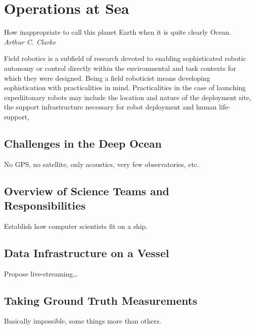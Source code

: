\chapter{Operations at Sea}

\begin{center}
    \begin{minipage}{0.5\textwidth}
      \begin{small}
        How inappropriate to call this planet Earth when it is quite clearly Ocean.\\ \emph{Arthur C. Clarke}
      \end{small}
    \end{minipage}
    \vspace{0.5cm}
\end{center}

Field robotics is a subfield of research devoted to enabling sophisticated robotic autonomy or control directly within the environmental and task contexts for which they were designed.
Being a field roboticist means developing sophistication with practicalities in mind.
Practicalities in the case of launching expediitonary robots may include the location and nature of the deployment site, the support infrastructure necessary for robot deployment and human life-support, 

 
\section{Challenges in the Deep Ocean}
No GPS, no satellite, only acoustics, very few observatories, etc.

\section{Overview of Science Teams and Responsibilities}
Establish how computer scientists fit on a ship.

\section{Data Infrastructure on a Vessel}
Propose live-streaming\dots

\section{Taking Ground Truth Measurements}
Basically impossible, some things more than others.

